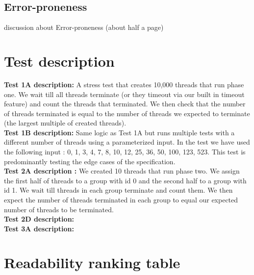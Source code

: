 \documentclass[11pt]{article}
\begin{document}
\pagebreak
\subsection{Error-proneness}
discussion about Error-proneness (about half a page)

\newpage
\appendix
\section{Test description}
\textbf{Test 1A description:} A stress test that creates 10,000 threads that run phase one. We wait till all threads terminate (or they timeout via our built in timeout feature) and count the threads that terminated. We then check that the number of threads terminated is equal to the number of threads we expected to terminate (the largest multiple of created threads).\\

\textbf{Test 1B description:} Same logic as Test 1A but runs multiple tests with a different number of threads using a parameterized input. In the test we have used the following input : {0, 1, 3, 4, 7, 8, 10, 12, 25, 36, 50, 100, 123, 523}. This test is predominantly testing the edge cases of the specification. \\

\textbf{Test 2A description :} We created 10 threads that run phase two. We assign the first half of threads to a group with id 0 and the second half to a group with id 1. We wait till threads in each group terminate and count them. We then expect the number of threads terminated in each group to equal our expected number of threads to be terminated. \\


\textbf{Test 2D description:}
\\

\textbf{Test 3A description:}
\\


\section{Readability ranking table}
\end{document}
